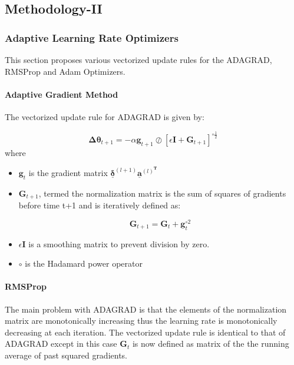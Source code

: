 \documentclass{article}
\begin{document}
\subsection{Methodology-II}

\subsubsection{Adaptive Learning Rate Optimizers}
This section proposes various vectorized update rules for the ADAGRAD, RMSProp and Adam Optimizers. 
\paragraph{Adaptive Gradient Method}
The vectorized update rule for ADAGRAD is given by:

\begin{equation}
\boldsymbol{\Delta{\theta}}_{t+1} = -\alpha\boldsymbol{g}_{t+1}\oslash[\epsilon\boldsymbol{I} + \boldsymbol{G}_{t+1}]^{\circ\frac{1}{2}}
\end{equation} 
where 
\begin{itemize}
	\item $\boldsymbol{g}_t$ is the gradient matrix $\underline{\boldsymbol{\delta}}^{(l+1)}\underline{\boldsymbol{a}}^{(l)^{\boldsymbol{T}}}$
	
	\item $\boldsymbol{G}_{t+1}$, termed the normalization matrix is the sum of squares of gradients before time t+1 and is iteratively defined as:
	
	\begin{equation}
	\boldsymbol{G}_{t+1} = \boldsymbol{G}_{t} + \boldsymbol{g}_{t}^{\circ{2}}
	\end{equation} 
	
	\item $\epsilon\boldsymbol{I}$ is a smoothing matrix to prevent division by zero.
	
	\item $\circ$ is the Hadamard power operator
\end{itemize}



\paragraph{RMSProp}
The main problem with ADAGRAD is that the elements of the normalization matrix are monotonically increasing thus the learning rate is monotonically decreasing at each iteration.
The vectorized update rule is identical to that of ADAGRAD except in this case $\boldsymbol{G}_t$ is now defined as matrix of the the running average of past squared gradients.
\end{document}
